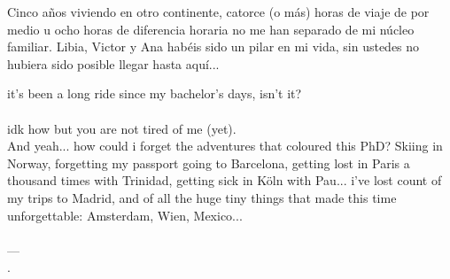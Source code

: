{{  \newpage
  \vspace*{4.8cm}

  \vspace{5mm}%
  Cinco años viviendo en otro continente, catorce (o más) horas de viaje de por
  medio u ocho horas de diferencia horaria no me han separado de mi núcleo
  familiar. Libia, Victor y Ana habéis sido un pilar en mi vida, sin ustedes no
  hubiera sido posible llegar hasta aquí...

  \noindent\hspace*{2\parindent}
    it's been a long ride since my bachelor's days, isn't it?\\ [-2pt]
  \hspace*{0.74\textwidth}\\ [-5pt]
  \noindent\hspace*{4\parindent}
    idk how but you are not tired of me (yet).\\ [-5pt]

  \vspace{11mm}%
  And yeah... how could i forget the adventures that coloured this PhD? Skiing in
  Norway, forgetting my passport going to Barcelona, getting lost in Paris
  a thousand times with Trinidad, getting sick in Köln with Pau...  i've lost
  count of my trips to Madrid, and of all the huge tiny things that made this
  time unforgettable:
  Amsterdam, Wien, Mexico...\\ [-0.2em]
  \vspace{-6pt}%
  \hspace*{0.88\textwidth}\\
  \vspace{-7pt}%
  \hspace*{0.88\textwidth}---\\
  \vspace{-12pt}%
  \hspace*{0.88\textwidth}.

}}

\hspace*{0.9\textwidth}

\vspace{-15pt}%
\noindent{}\\

\vspace{-1.1pt}%
\hspace*{0.8\textwidth}\makebox[0pt][r]{
  \vcastor[2025]
}

\newpage

